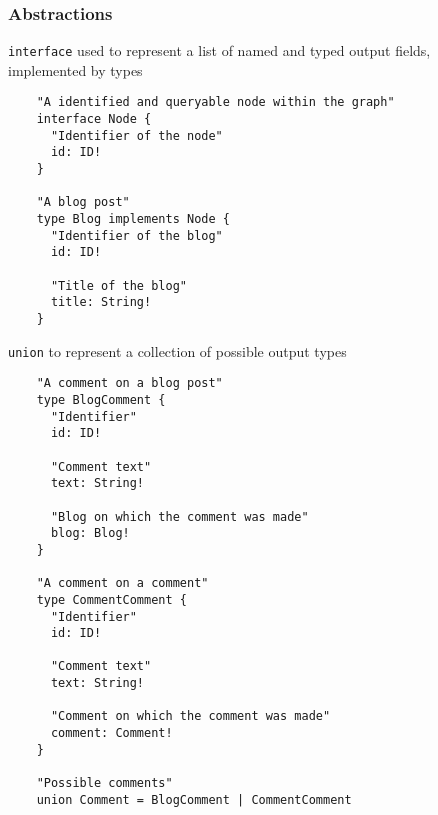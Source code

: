 \documentclass[notes]{beamer}
\begin{document}
\begin{frame}[fragile]
  \frametitle{Abstractions}
  \texttt{interface} used to represent a
  list of named and typed output fields, implemented by types
  \begin{verbatim}
    "A identified and queryable node within the graph"
    interface Node {
      "Identifier of the node"
      id: ID!
    }

    "A blog post"
    type Blog implements Node {
      "Identifier of the blog"
      id: ID!

      "Title of the blog"
      title: String!
    }
\end{verbatim}

  \texttt{union} to represent a collection of possible output types
  \begin{verbatim}
    "A comment on a blog post"
    type BlogComment {
      "Identifier"
      id: ID!

      "Comment text"
      text: String!

      "Blog on which the comment was made"
      blog: Blog!
    }

    "A comment on a comment"
    type CommentComment {
      "Identifier"
      id: ID!

      "Comment text"
      text: String!

      "Comment on which the comment was made"
      comment: Comment!
    }

    "Possible comments"
    union Comment = BlogComment | CommentComment
\end{verbatim}
\end{frame}
\end{document}
